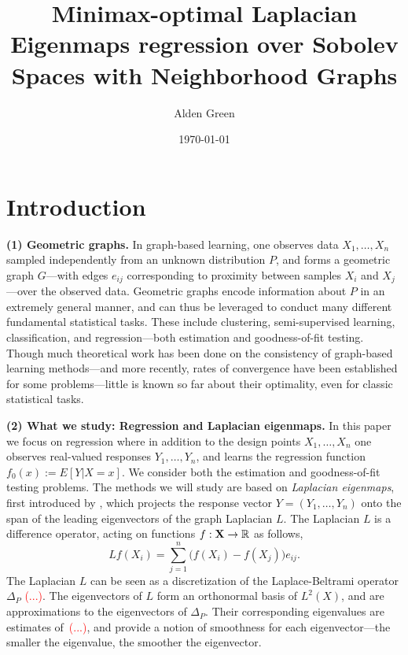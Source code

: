 \documentclass{article}
\newcommand{\Reals}{\mathbb{R}}
\newcommand{\1}{\mathbf{1}}
\theoremstyle{alden}
\theoremstyle{aldenthm}
\theoremstyle{definition}
\theoremstyle{remark}
\begin{document}
\title{Minimax-optimal Laplacian Eigenmaps regression over Sobolev Spaces with Neighborhood Graphs}
\author{Alden Green}
\date{\today}
\maketitle

\section{Introduction}
\label{sec:introduction}

\textbf{(1) Geometric graphs.} In graph-based learning, one observes data $X_1,\ldots,X_n$ sampled independently from an unknown distribution $P$, and forms a geometric graph $G$---with edges $e_{ij}$ corresponding to proximity between samples $X_i$ and $X_j$---over the observed data. Geometric graphs encode information about $P$ in an extremely general manner, and can thus be leveraged to conduct many different fundamental statistical tasks. These include clustering, semi-supervised learning, classification, and regression---both estimation and goodness-of-fit testing. Though much theoretical work has been done on the consistency of graph-based learning methods---and more recently, rates of convergence have been established for some problems---little is known so far about their optimality, even for classic statistical tasks. 

\textbf{(2) What we study: Regression and Laplacian eigenmaps.} In this paper we focus on regression where in addition to the design points $X_1,\ldots,X_n$ one observes real-valued responses $Y_1,\ldots,Y_n$, and learns the regression function $f_0(x) := E[Y|X = x]$. We consider both the estimation and goodness-of-fit testing problems. The methods we will study are based on \emph{Laplacian eigenmaps}, first introduced by \cite{belkin03a}, which projects the response vector $Y = (Y_1,\ldots,Y_n)$ onto the span of the leading eigenvectors of the graph Laplacian $L$. The Laplacian $L$ is a difference operator, acting on functions $f: {\bf X} \to \Reals$ as follows,
\begin{equation}
\label{eqn:graph_laplacian}
Lf(X_i) = \sum_{j = 1}^{n} \bigl(f(X_i) - f(X_j)\bigr)e_{ij}. 
\end{equation}
The Laplacian $L$ can be seen as a discretization of the Laplace-Beltrami operator $\Delta_P$ \textcolor{red}{(...)}. The eigenvectors of $L$ form an orthonormal basis of $L^2(X)$, and are approximations to the eigenvectors of $\Delta_P$. Their corresponding eigenvalues are estimates of~\textcolor{red}{(...)}, and provide a notion of smoothness for each eigenvector---the smaller the eigenvalue, the smoother the eigenvector. 
\end{document}
